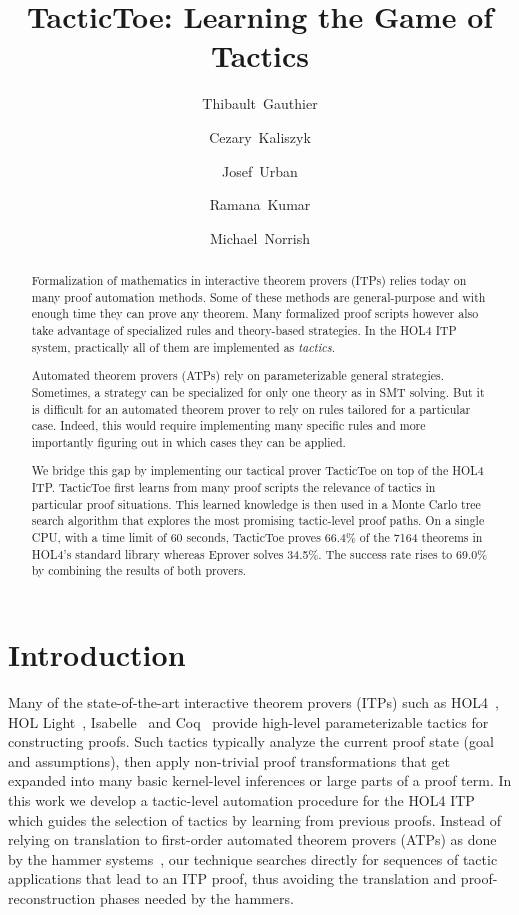 \documentclass[runningheads,a4paper,draft]{svjour3}
\title{TacticToe: Learning the Game of Tactics}
\author{\mbox{Thibault Gauthier} \and \mbox{Cezary Kaliszyk} \and \mbox{Josef
Urban} \and \mbox{Ramana Kumar} \and \mbox{Michael Norrish}}
\institute{Thibault Gauthier and Cezary Kaliszyk \at
Department of Computer Science, University of Innsbruck,
Innsbruck, Austria\\ \url{{thibault.gauthier,cezary.kaliszyk}@uibk.ac.at}
\and
Josef Urban \at Czech Technical University, Prague\\\url{josef.urban@gmail.com}
\and Ramana Kumar and Michael Norrish \at Data61}
\newcommand{\todoi}[1]{\todo[inline]{#1}}
\def\holfour{\textsf{HOL4}\xspace}
\def\isabelle{\textsf{Isabelle}\xspace}
\def\hollight{\textsf{HOL Light}\xspace}
\def\coq{\textsf{Coq}\xspace}
\begin{document}
\maketitle

\begin{abstract}
Formalization of mathematics in interactive theorem provers (ITPs)
relies today on many proof automation methods.
Some of these methods are general-purpose and with enough time they can prove any
theorem. Many formalized proof scripts however also
take advantage of specialized rules and theory-based strategies.
In the HOL4 ITP system, practically all of them are implemented as \emph{tactics}.

Automated theorem provers (ATPs) rely on parameterizable general
strategies. Sometimes, a strategy can be specialized for only one theory as in
SMT solving. But it is difficult for an automated theorem prover to rely on
rules tailored for a particular case.
Indeed, this would require implementing many specific rules and more
importantly figuring out in which cases they can be applied.

We bridge this gap by implementing our tactical prover TacticToe on top
of the HOL4 ITP.
TacticToe first learns from many proof scripts
the relevance of tactics in particular proof situations.
This learned knowledge is then used in a Monte Carlo tree search algorithm that explores the most promising tactic-level proof paths.
On a single CPU, with a time limit of 60 seconds, TacticToe proves 66.4\%
of the 7164 theorems in HOL4's standard library whereas
Eprover solves 34.5\%. The success rate rises to 69.0\% by combining the
results of both provers.
\end{abstract}

\tableofcontents
\todoi{Comparison with hammers in usability}

\section{Introduction}

Many of the state-of-the-art interactive theorem provers (ITPs) such as
  \holfour~\cite{hol4}, \hollight~\cite{Harrison09hollight},
  \isabelle~\cite{isabelle}
  and \coq~\cite{coq-book} provide high-level parameterizable tactics for constructing proofs.
  Such tactics typically analyze the current proof state (goal and
  assumptions), then apply non-trivial proof transformations that get
  expanded into many basic kernel-level inferences or large parts of a proof term.
  In this work we develop a tactic-level automation procedure for the \holfour ITP
  which guides the selection of tactics by learning from previous
  proofs.  Instead of relying on translation to first-order automated
  theorem provers (ATPs) as done by the hammer
  systems~\cite{hammers4qed,tgck-cpp15}, our technique
  searches directly for sequences of tactic applications that lead to
  an ITP proof, thus avoiding the translation and proof-reconstruction phases needed by the hammers.
\end{document}
